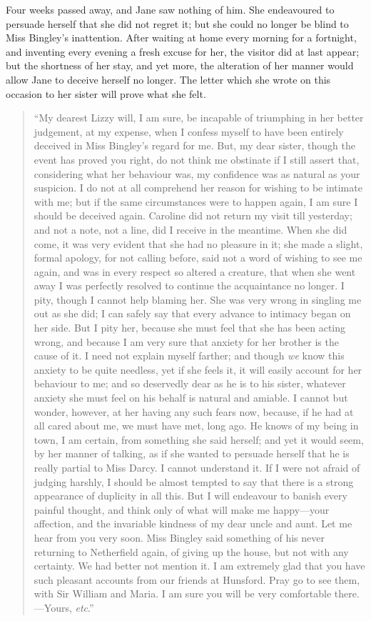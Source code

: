 \documentclass[12pt,english]{book}
\begin{document}
Four weeks passed away, and Jane saw nothing of him. She endeavoured
to persuade herself that she did not regret it; but she could no longer
be blind to Miss Bingley's inattention. After waiting at home every
morning for a fortnight, and inventing every evening a fresh excuse
for her, the visitor did at last appear; but the shortness of her
stay, and yet more, the alteration of her manner would allow Jane
to deceive herself no longer. The letter which she wrote on this occasion
to her sister will prove what she felt.

\begin{quote}
{}``My dearest Lizzy will, I am sure, be incapable of triumphing
in her better judgement, at my expense, when I confess myself to have
been entirely deceived in Miss Bingley's regard for me. But, my dear
sister, though the event has proved you right, do not think me obstinate
if I still assert that, considering what her behaviour was, my confidence
was as natural as your suspicion. I do not at all comprehend her reason
for wishing to be intimate with me; but if the same circumstances
were to happen again, I am sure I should be deceived again. Caroline
did not return my visit till yesterday; and not a note, not a line,
did I receive in the meantime. When she did come, it was very evident
that she had no pleasure in it; she made a slight, formal apology,
for not calling before, said not a word of wishing to see me again,
and was in every respect so altered a creature, that when she went
away I was perfectly resolved to continue the acquaintance no longer.
I pity, though I cannot help blaming her. She was very wrong in singling
me out as she did; I can safely say that every advance to intimacy
began on her side. But I pity her, because she must feel that she
has been acting wrong, and because I am very sure that anxiety for
her brother is the cause of it. I need not explain myself farther;
and though \textit{we} know this anxiety to be quite needless, yet
if she feels it, it will easily account for her behaviour to me; and
so deservedly dear as he is to his sister, whatever anxiety she must
feel on his behalf is natural and amiable. I cannot but wonder, however,
at her having any such fears now, because, if he had at all cared
about me, we must have met, long ago. He knows of my being in town,
I am certain, from something she said herself; and yet it would seem,
by her manner of talking, as if she wanted to persuade herself that
he is really partial to Miss Darcy. I cannot understand it. If I were
not afraid of judging harshly, I should be almost tempted to say that
there is a strong appearance of duplicity in all this. But I will
endeavour to banish every painful thought, and think only of what
will make me happy\mbox{---}your affection, and the invariable kindness
of my dear uncle and aunt. Let me hear from you very soon. Miss Bingley
said something of his never returning to Netherfield again, of giving
up the house, but not with any certainty. We had better not mention
it. I am extremely glad that you have such pleasant accounts from
our friends at Hunsford. Pray go to see them, with Sir William and
Maria. I am sure you will be very comfortable there.\mbox{---}Yours,
\textit{etc}.'' 
\end{quote}
\end{document}
